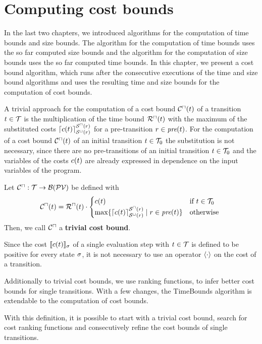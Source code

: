 \section{Computing cost bounds}

In the last two chapters, we introduced algorithms for the computation of time bounds and size bounds.
The algorithm for the computation of time bounds uses the so far computed size bounds and the algorithm for the computation of size bounds uses the so far computed time bounds.
In this chapter, we present a cost bound algorithm, which runs after the consecutive executions of the time and size bound algorithms and uses the resulting time and size bounds for the computation of cost bounds.

A trivial approach for the computation of a cost bound ${\mathcal{C}^\sqcap}(t)$ of a transition $t \in \mathcal{T}$ is the multiplication of the time bound ${\mathcal{R}^\sqcap}(t)$ with the maximum of the substituted costs $\lceil c(t) \rceil^{{\mathcal{S}^\sqcap}(r)}_{{\mathcal{S}^\sqcup}(r)}$ for a pre-transition $r \in \emph{pre}(t)$.
For the computation of a cost bound ${\mathcal{C}^\sqcap}(t)$ of an initial transition $t \in \mathcal{T}_0$ the substitution is not necessary, since there are no pre-transitions of an initial transition $t \in \mathcal{T}_0$ and the variables of the costs $c(t)$ are already expressed in dependence on the input variables of the program.

\begin{definition}
  Let ${\mathcal{C}^\sqcap}: \mathcal{T} \rightarrow \mathcal{B}(\mathcal{PV})$ be defined with
  \[ {\mathcal{C}^\sqcap}(t) = {\mathcal{R}^\sqcap}(t) \cdot
  \begin{cases}
    c(t) & \text{if } t \in \mathcal{T}_0 \\
    \max \lbrace \lceil c(t) \rceil^{{\mathcal{S}^\sqcap}(r)}_{{\mathcal{S}^\sqcup}(r)} \mid r \in \emph{pre}(t) \rbrace & \text{otherwise }
  \end{cases}
  \]
  Then, we call ${\mathcal{C}^\sqcap}$ a \textbf{trivial cost bound}. 
\end{definition}

Since the cost $\llbracket c(t) \rrbracket_{\sigma}$ of a single evaluation step with $t \in \mathcal{T}$ is defined to be positive for every state $\sigma$, it is not necessary to use an operator $\langle\cdot\rangle$ on the cost of a transition.

\begin{example}

\end{example}

Additionally to trivial cost bounds, we use ranking functions, to infer better cost bounds for single transitions.
With a few changes, the TimeBounds algorithm is extendable to the computation of cost bounds.



With this definition, it is possible to start with a trivial cost bound, search for cost ranking functions and consecutively refine the cost bounds of single transitions.
